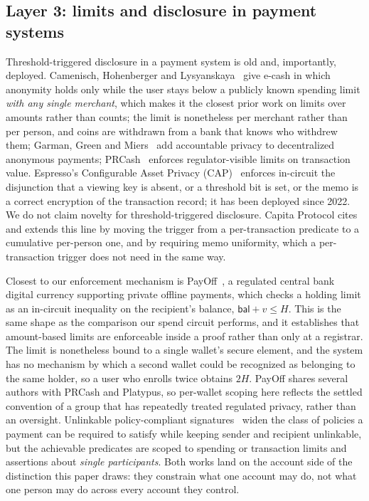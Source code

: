 \documentclass[11pt,a4paper]{article}
\theoremstyle{definition}
\theoremstyle{plain}
\theoremstyle{remark}
\begin{document}
\subsection{Layer 3: limits and disclosure in payment systems}

Threshold-triggered disclosure in a payment system is old and, importantly, deployed. Camenisch, Hohenberger and Lysyanskaya~\cite{chl2006} give e-cash in which anonymity holds only while the user stays below a publicly known spending limit \emph{with any single merchant}, which makes it the closest prior work on limits over amounts rather than counts; the limit is nonetheless per merchant rather than per person, and coins are withdrawn from a bank that knows who withdrew them; Garman, Green and Miers~\cite{ggm16} add accountable privacy to decentralized anonymous payments; PRCash~\cite{prcash} enforces regulator-visible limits on transaction value. Espresso's Configurable Asset Privacy (CAP)~\cite{cap} enforces in-circuit the disjunction that a viewing key is absent, or a threshold bit is set, or the memo is a correct encryption of the transaction record; it has been deployed since 2022. We do not claim novelty for threshold-triggered disclosure. Capita Protocol cites and extends this line by moving the trigger from a per-transaction predicate to a cumulative per-person one, and by requiring memo uniformity, which a per-transaction trigger does not need in the same way.

Closest to our enforcement mechanism is PayOff~\cite{payoff}, a regulated central bank digital currency supporting private offline payments, which checks a holding limit as an in-circuit inequality on the recipient's balance, $\mathsf{bal} + v \le H$. This is the same shape as the comparison our spend circuit performs, and it establishes that amount-based limits are enforceable inside a proof rather than only at a registrar. The limit is nonetheless bound to a single wallet's secure element, and the system has no mechanism by which a second wallet could be recognized as belonging to the same holder, so a user who enrolls twice obtains $2H$. PayOff shares several authors with PRCash and Platypus, so per-wallet scoping here reflects the settled convention of a group that has repeatedly treated regulated privacy, rather than an oversight. Unlinkable policy-compliant signatures~\cite{ulpcs} widen the class of policies a payment can be required to satisfy while keeping sender and recipient unlinkable, but the achievable predicates are scoped to spending or transaction limits and assertions about \emph{single participants}. Both works land on the account side of the distinction this paper draws: they constrain what one account may do, not what one person may do across every account they control.
\end{document}
